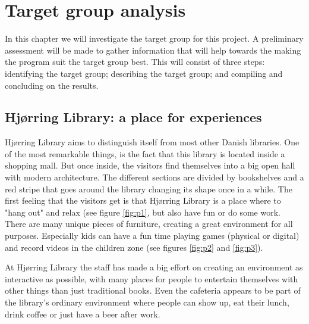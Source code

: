 \chapter{Target group analysis}
In this chapter we will investigate the target group for this project. A preliminary assessment will be made to gather information that will help towards the making the program suit the target group best. This will consist of three steps: identifying the target group; describing the target group; and compiling and concluding on the results.

\section{Hj{\o}rring Library: a place for experiences}\label{hjoerring}

Hj{\o}rring Library aims to distinguish itself from most other Danish libraries. One of the most remarkable things, is the fact that this library is located inside a shopping mall. But once inside, the visitors find themselves into a big open hall with modern architecture. The different sections are divided by bookshelves and a red stripe that goes around the library changing its shape once in a while. The first feeling that the visitors get is that Hj{\o}rring Library is a place where to "hang out" and relax (see figure \ref{fig:p1}, but also have fun or do some work. There are many unique pieces of furniture, creating a great environment for all purposes. Especially kids can have a fun time playing games (physical or digital) and record videos in the children zone (see figures \ref{fig:p2} and \ref{fig:p3}).

At Hj{\o}rring Library the staff has made a big effort on creating an environment as interactive as possible, with many places for people to entertain themselves with other things than just traditional books. Even the cafeteria appears to be part of the library's ordinary environment where people can show up, eat their lunch, drink coffee or just have a beer after work.

